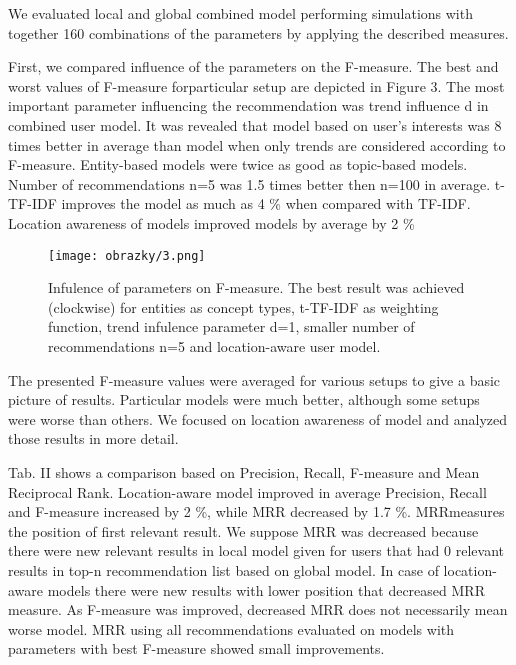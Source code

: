 \documentclass[a4, conference]{IEEEtran}
\begin{document}
 We evaluated local and global combined model performing simulations  with  together  160  combinations  of the parameters by applying the described measures.

 First, we compared influence of the parameters on the F-measure.   The   best   and   worst   values   of   F-measure   forparticular setup are depicted in Figure 3. The most important parameter influencing the recommendation was trend influence d  in  combined user  model.  It  was revealed  that model based on user’s interests was 8 times better in average than model when only trends are considered according to F-measure.  Entity-based  models  were  twice  as  good  as topic-based  models.  Number  of  recommendations n=5  was  1.5 times  better  then n=100  in  average.  t-TF-IDF  improves  the model   as   much as 4 \% when compared with  TF-IDF. Location  awareness  of  models  improved  models  by  average by 2 \%

\begin{figure}[h!]
\texttt{[image: obrazky/3.png]}
\caption{Infulence of parameters on F-measure. The best result was achieved (clockwise) for entities as concept types, t-TF-IDF as weighting function, trend infulence parameter d=1, smaller number of recommendations n=5 and location-aware user model.}
\end{figure}

The   presented   F-measure   values   were   averaged   for various  setups  to  give  a  basic  picture  of  results. Particular models  were  much  better, although  some  setups  were worse than others. We focused on location awareness of model and analyzed those results in more detail. 

 Tab.  II  shows  a  comparison based  on  Precision,  Recall, F-measure   and   Mean   Reciprocal   Rank.   Location-aware model improved in average Precision, Recall and F-measure increased  by  2  \%,  while  MRR  decreased  by  1.7  \%.  MRRmeasures  the  position  of  first  relevant  result.  We suppose MRR was decreased because there were new relevant results in  local  model  given  for  users  that  had  0  relevant results  in top-n recommendation list based on global model. In case of location-aware  models  there  were  new  results  with  lower position  that  decreased  MRR  measure.  As  F-measure  was improved, decreased  MRR  does  not  necessarily  mean  worse model.   MRR   using   all   recommendations   evaluated   on models  with  parameters  with  best  F-measure  showed  small improvements. 
\end{document}
